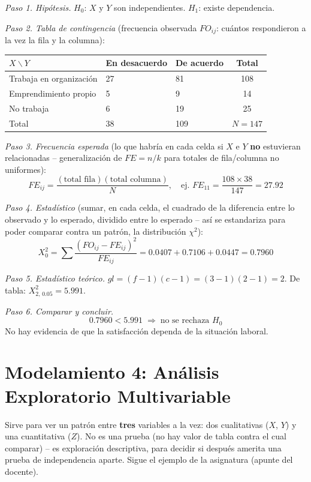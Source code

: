 \documentclass[12pt]{article}
\begin{document}
\textit{Paso 1. Hipótesis.} $H_0$: $X$ y $Y$ son independientes. $H_1$: existe dependencia.

\textit{Paso 2. Tabla de contingencia} (frecuencia observada $FO_{ij}$: cuántos respondieron a la vez la fila y la columna):

\begin{tabular}{L{3.6cm}C{2.6cm}C{2.6cm}|c}
\toprule
$X \backslash Y$ & En desacuerdo & De acuerdo & Total \\
\midrule
Trabaja en organización & 27 & 81 & 108 \\
Emprendimiento propio & 5 & 9 & 14 \\
No trabaja & 6 & 19 & 25 \\
\midrule
Total & 38 & 109 & $N=147$ \\
\bottomrule
\end{tabular}

\textit{Paso 3. Frecuencia esperada} (lo que habría en cada celda si $X$ e $Y$ \textbf{no} estuvieran relacionadas -- generalización de $FE=n/k$ para totales de fila/columna no uniformes):
\[
FE_{ij} = \frac{(\text{total fila})(\text{total columna})}{N}, \quad \text{ej. } FE_{11} = \frac{108\times38}{147} = 27.92
\]

\textit{Paso 4. Estadístico} (sumar, en cada celda, el cuadrado de la diferencia entre lo observado y lo esperado, dividido entre lo esperado -- así se estandariza para poder comparar contra un patrón, la distribución $\chi^2$):
\[
X_0^2 = \sum \frac{(FO_{ij}-FE_{ij})^2}{FE_{ij}} = 0.0407+0.7106+0.0447 = 0.7960
\]

\textit{Paso 5. Estadístico teórico.} $gl=(f-1)(c-1)=(3-1)(2-1)=2$. De tabla: $X^2_{2,\,0.05}=5.991$.

\textit{Paso 6. Comparar y concluir.}
\[
0.7960 < 5.991 \;\Longrightarrow\; \text{no se rechaza } H_0
\]
No hay evidencia de que la satisfacción dependa de la situación laboral.

\section*{Modelamiento 4: Análisis Exploratorio Multivariable}

Sirve para ver un patrón entre \textbf{tres} variables a la vez: dos cualitativas ($X$, $Y$) y una cuantitativa ($Z$). No es una prueba (no hay valor de tabla contra el cual comparar) -- es exploración descriptiva, para decidir si después amerita una prueba de independencia aparte. Sigue el ejemplo de la asignatura (apunte del docente).
\end{document}
